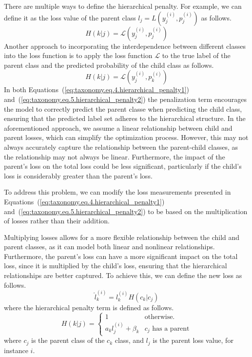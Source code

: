 There are multiple ways to define the hierarchical penalty. For example, we can define it as the loss value of the parent class $l_j=L\left(y_j^{(i)},p_j^{(i)}\right) $ as follows.
\begin{equation}
    H(k \vert j)=\mathcal{L} \left(y_j^{(i)},p_j^{(i)}\right)
    \label{eq:taxonomy.eq.4.hierarchical_penalty1}
\end{equation}
Another approach to incorporating the interdependence between different classes into the loss function is to apply the loss function $\mathcal{L} $ to the true label of the parent class and the predicted probability of the child class as follows.
\begin{equation}
    H\left(k\vert j\right) = \mathcal{L} \left(y_j^{(i)},p_k^{(i)}\right)
    \label{eq:taxonomy.eq.5.hierarchical_penalty2}
\end{equation}
In both Equations~(\ref{eq:taxonomy.eq.4.hierarchical_penalty1}) and~(\ref{eq:taxonomy.eq.5.hierarchical_penalty2}) the penalization term encourages the model to correctly predict the parent classe when predicting the child class, ensuring that the predicted label set adheres to the hierarchical structure. In the aforementioned approach, we assume a linear relationship between child and parent losses, which can simplify the optimization process. However, this may not always accurately capture the relationship between the parent-child classes, as the relationship may not always be linear. Furthermore, the impact of the parent's loss on the total loss could be less significant, particularly if the child's loss is considerably greater than the parent's loss.

To address this problem, we can modify the loss measurements presented in Equations~(\ref{eq:taxonomy.eq.4.hierarchical_penalty1}) and~(\ref{eq:taxonomy.eq.5.hierarchical_penalty2})  to be based on the multiplication of losses rather than their addition. 

Multiplying losses allows for a more flexible relationship between the child and parent classes, as it can model both linear and nonlinear relationships. Furthermore, the parent's loss can have a more significant impact on the total loss, since it is multiplied by the child's loss, ensuring that the hierarchical relationships are better captured. To achieve this, we can define the new loss as follows.
\begin{equation}
    \label{eq:taxonomy.eq.7.newloss}
    \widehat{l}_k^{(i)} = l_k^{(i)} H \left( c_k \vert c_j \right)
\end{equation}
where the hierarchical penalty term is defined as follows.
\begin{equation}
    \label{eq:taxonomy.eq.8.hierarchical_penalty.loss}
    H(k \vert j) = \left\{ \begin{array}{lc}1 & \text{otherwise.} \\ a_k l_j^{(i)} + \beta_k & c_j \text{ has a parent} \end{array} \right.
\end{equation}
where $c_j $ is the parent class of the $c_k $ class, and $l_j $ is the parent loss value, for instance $i $.

